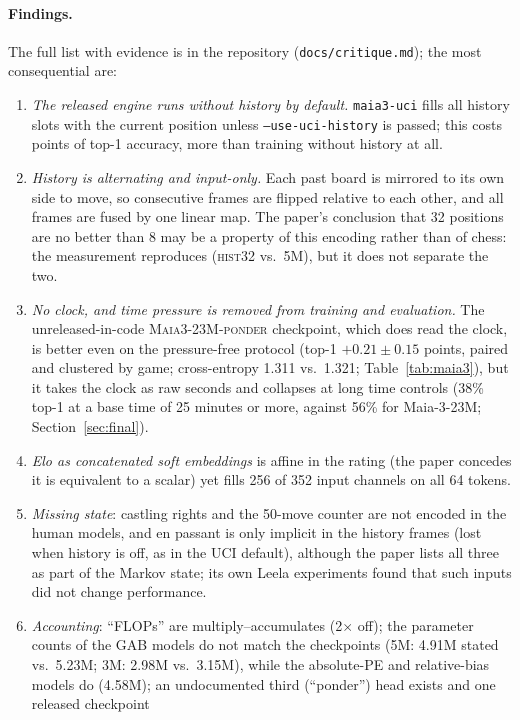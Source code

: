 \paragraph{Findings.} The full list with evidence is in the repository
(\texttt{docs/critique.md}); the most consequential are:
\begin{enumerate}
\item \emph{The released engine runs without history by default.} \texttt{maia3-uci} fills all
history slots with the current position unless \texttt{--use-uci-history} is passed; this costs
 points of top-1 accuracy, more than training without history at all.
\item \emph{History is alternating and input-only.} Each past board is mirrored to its own side to
move, so consecutive frames are flipped relative to each other, and all frames are fused by one
linear map. The paper's conclusion that 32 positions are no better than 8 may be a property of this
encoding rather than of chess: the measurement reproduces (\textsc{hist32} vs.\ 5M), but it does not
separate the two.
\item \emph{No clock, and time pressure is removed from training and evaluation.} The unreleased-in-code
\textsc{Maia3-23M-ponder} checkpoint, which does read the clock, is better even on the
pressure-free protocol (top-1 $+0.21\pm0.15$ points, paired and clustered by game; cross-entropy
1.311 vs.\ 1.321; Table~\ref{tab:maia3}), but it takes the clock as raw seconds and collapses at long
time controls (38\% top-1 at a base time of 25 minutes or more, against 56\% for Maia-3-23M;
Section~\ref{sec:final}).
\item \emph{Elo as concatenated soft embeddings} is affine in the rating (the paper concedes it is
equivalent to a scalar) yet fills 256 of 352 input channels on all 64 tokens.
\item \emph{Missing state}: castling rights and the 50-move counter are not encoded in the human
models, and en passant is only implicit in the history frames (lost when history is off, as in the
UCI default), although the paper lists all three as part of the Markov state; its own Leela
experiments found that such inputs did not change performance.
\item \emph{Accounting}: ``FLOPs'' are multiply--accumulates (2$\times$ off); the parameter counts of
the GAB models do not match the checkpoints (5M: 4.91M stated vs.\ 5.23M; 3M: 2.98M vs.\ 3.15M), while
the absolute-PE and relative-bias models do (4.58M); an undocumented third (``ponder'') head exists and one released checkpoint

\end{enumerate}
